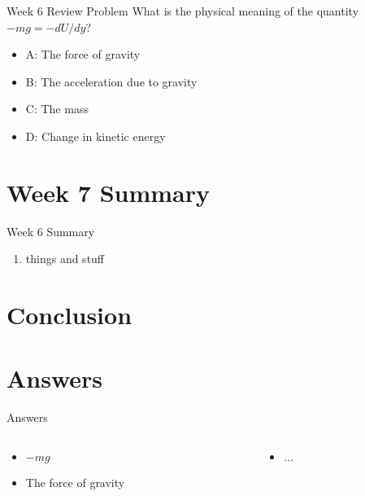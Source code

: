 \documentclass{beamer}
\begin{document}
\begin{frame}{Week 6 Review Problem}
What is the physical meaning of the quantity $-mg =-dU/dy$?
\begin{itemize}
\item A: The force of gravity 
\item B: The acceleration due to gravity
\item C: The mass
\item D: Change in kinetic energy
\end{itemize}
\end{frame}

\section{Week 7 Summary}

\begin{frame}{Week 6 Summary}
\begin{enumerate}
\item things and stuff
\end{enumerate}
\end{frame}

\section{Conclusion}

\section{Answers}

\begin{frame}{Answers}
\begin{columns}[T]
\begin{column}{0.5\textwidth}
\begin{itemize}
\item $-mg$
\item The force of gravity 
\end{itemize}
\end{column}
\begin{column}{0.5\textwidth}
\begin{itemize}
\item ...
\end{itemize}
\end{column}
\end{columns}
\end{frame}
\end{document}
